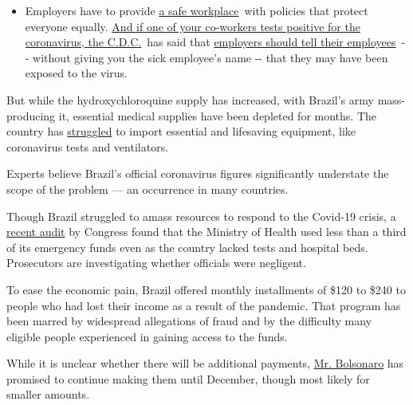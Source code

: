 \begin{itemize}
  \begin{itemize}
  \tightlist
  \item
    Employers have to provide
    \href{https://www.osha.gov/SLTC/covid-19/standards.html}{a safe
    workplace}~with policies that protect everyone equally.
    \href{https://www.nytimes3xbfgragh.onion/article/coronavirus-money-unemployment.html?action=click\&pgtype=Article\&state=default\&region=MAIN_CONTENT_3\&context=storylines_faq}{And
    if one of your co-workers tests positive for the coronavirus, the
    C.D.C.}~has said that
    \href{https://www.cdc.gov/coronavirus/2019-ncov/community/guidance-business-response.html}{employers
    should tell their employees}~-\/- without giving you the sick
    employee's name -\/- that they may have been exposed to the virus.
  \end{itemize}
\end{itemize}

But while the hydroxychloroquine supply has increased, with Brazil's
army mass-producing it, essential medical supplies have been depleted
for months. The country has
\href{https://www.nytimes3xbfgragh.onion/2020/04/09/world/coronavirus-equipment-rich-poor.html}{struggled}
to import essential and lifesaving equipment, like coronavirus tests and
ventilators.

Experts believe Brazil's official coronavirus figures significantly
understate the scope of the problem --- an occurrence in many countries.

Though Brazil struggled to amass resources to respond to the Covid-19
crisis, a
\href{https://www1.folha.uol.com.br/cotidiano/2020/07/ministerio-da-saude-gastou-menos-de-13-da-verba-para-covid-diz-tcu.shtml}{recent
audit} by Congress found that the Ministry of Health used less than a
third of its emergency funds even as the country lacked tests and
hospital beds. Prosecutors are investigating whether officials were
negligent.

To ease the economic pain, Brazil offered monthly installments of \$120
to \$240 to people who had lost their income as a result of the
pandemic. That program has been marred by widespread allegations of
fraud and by the difficulty many eligible people experienced in gaining
access to the funds.

While it is unclear whether there will be additional payments,
\href{https://g1.globo.com/rn/rio-grande-do-norte/noticia/2020/08/21/bolsonaro-diz-que-auxilio-emergencial-vai-ser-ate-dezembro-so-nao-sei-o-valor.ghtml}{Mr.
Bolsonaro} has promised to continue making them until December, though
most likely for smaller amounts.

